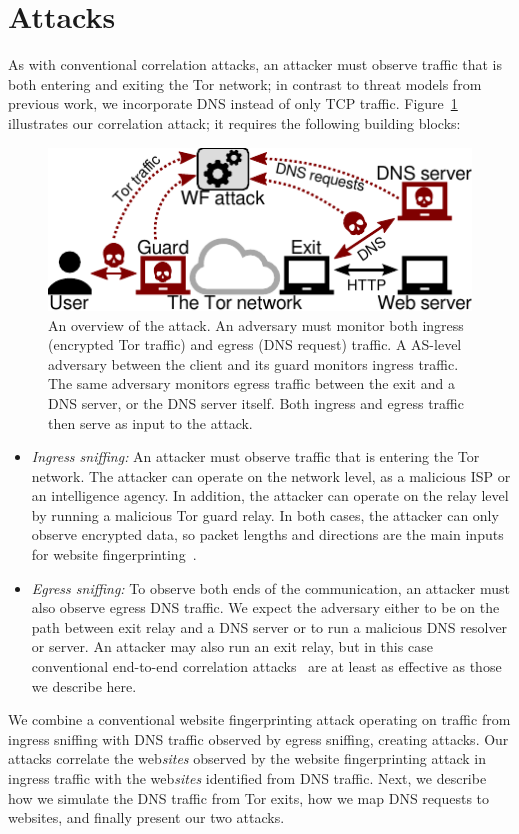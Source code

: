 \section{\name Attacks}
\label{sec:attack}

As with conventional correlation attacks, an attacker must observe
traffic that is both entering and exiting
the Tor network; in contrast to threat models from previous work, we
incorporate DNS instead of only
TCP traffic.
Figure~\ref{fig:attack-scenario} illustrates our correlation attack; it requires the
following building blocks:
\begin{figure}[t]
	\centering
	\includegraphics[width=0.8\linewidth]{figures/attack-scenario.pdf}
	\caption{An overview of the \name attack.  An adversary must monitor
		both ingress (encrypted Tor traffic) and egress (DNS request) traffic.
		A AS-level adversary between the
		client and its guard monitors ingress traffic.  The same adversary
		monitors egress traffic between the exit and a DNS server, or the DNS
		server itself.  Both ingress and egress traffic then serve as input to the
		\name attack.}
	\label{fig:attack-scenario}
\end{figure}

\begin{itemize}
    \item \emph{Ingress sniffing:} An attacker must observe traffic that is
		entering the Tor network.  The attacker can operate on the network level,
		as a malicious ISP or an intelligence agency.  In addition, the
		attacker can operate on the relay level by running a malicious Tor guard
		relay.  In both cases, the attacker can only observe encrypted
		data, so packet lengths and
		directions are the main inputs for website fingerprinting~\cite{Panchenko2016a}.
    \item \emph{Egress sniffing:} To observe both ends of the communication, an
		attacker must also observe egress DNS traffic.  We expect the adversary
		either to be on the path between exit relay
		and a DNS server or to run a malicious DNS
		resolver or server.  An attacker may also run an exit relay,
		but in this case conventional end-to-end correlation
		attacks~\cite{Murdoch2007a} are at least as effective as those we
		describe here.
\end{itemize}
We combine a conventional website fingerprinting attack operating on traffic
from ingress sniffing with
DNS traffic observed by egress sniffing, creating \name attacks. Our attacks
correlate the web\emph{sites} observed by the website fingerprinting attack in
ingress traffic with
the web\emph{sites} identified from DNS traffic. Next, we describe how we
simulate the DNS traffic from Tor exits, how we map DNS requests to websites,
and finally present our two \name attacks.

